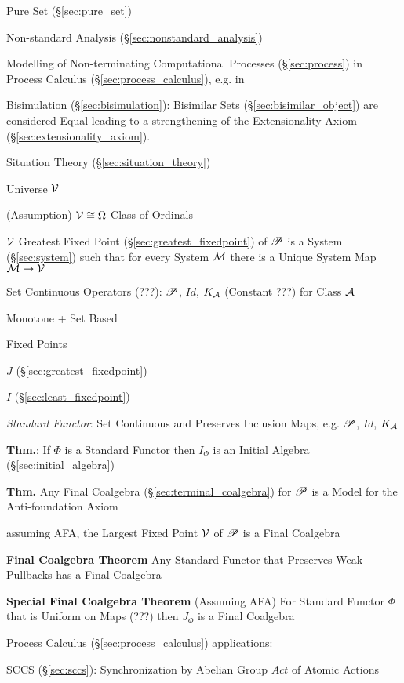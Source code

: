 Pure Set (\S\ref{sec:pure_set})

Non-standard Analysis (\S\ref{sec:nonstandard_analysis})

Modelling of Non-terminating Computational Processes
(\S\ref{sec:process}) in Process Calculus
(\S\ref{sec:process_calculus}), e.g. in
\cite{abramsky-gay-nagarajan96}

Bisimulation (\S\ref{sec:bisimulation}): Bisimilar Sets
(\S\ref{sec:bisimilar_object}) are considered Equal leading to a
strengthening of the Extensionality Axiom
(\S\ref{sec:extensionality_axiom}).

Situation Theory (\S\ref{sec:situation_theory})

Universe $\mathcal{V}$

(Assumption) $\mathcal{V} \cong \Omega$ Class of Ordinals

$\mathcal{V}$ Greatest Fixed Point (\S\ref{sec:greatest_fixedpoint}) of
$\mathscr{P}$ is a System (\S\ref{sec:system}) such that for every System
$\mathcal{M}$ there is a Unique System Map $\mathcal{M} \rightarrow
\mathcal{V}$

Set Continuous Operators (???): $\mathscr{P}$, $Id$, $K_\mathcal{A}$ (Constant
???) for Class $\mathcal{A}$

Monotone + Set Based

Fixed Points

$J$ (\S\ref{sec:greatest_fixedpoint})

$I$ (\S\ref{sec:least_fixedpoint})

\emph{Standard Functor}: Set Continuous and Preserves Inclusion Maps,
e.g. $\mathscr{P}$, $Id$, $K_\mathcal{A}$

\textbf{Thm.}: If $\Phi$ is a Standard Functor then $I_\Phi$ is an
Initial Algebra (\S\ref{sec:initial_algebra})

\textbf{Thm.} Any Final Coalgebra (\S\ref{sec:terminal_coalgebra}) for
$\mathscr{P}$ is a Model for the Anti-foundation Axiom

assuming AFA, the Largest Fixed Point $\mathcal{V}$ of $\mathscr{P}$ is a Final
Coalgebra

\textbf{Final Coalgebra Theorem} Any Standard Functor that Preserves
Weak Pullbacks has a Final Coalgebra

\textbf{Special Final Coalgebra Theorem} (Assuming AFA) For Standard
Functor $\Phi$ that is Uniform on Maps (???) then $J_\Phi$ is a Final
Coalgebra

Process Calculus (\S\ref{sec:process_calculus}) applications:

SCCS (\S\ref{sec:sccs}): Synchronization by Abelian Group $Act$ of
Atomic Actions

